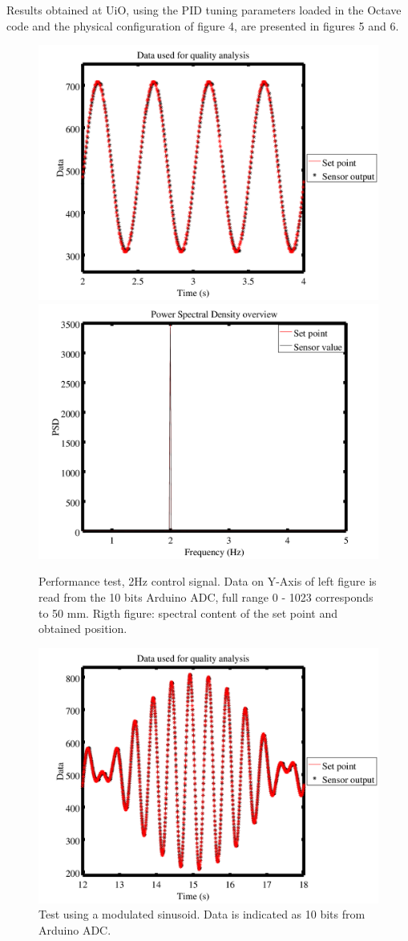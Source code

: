\documentclass[pdftex,a4paper,12pt,onecolumn,fleqn,captions=tableheading]{scrartcl}
\begin{document}
Results obtained at UiO, using the PID tuning parameters loaded in the Octave code and the physical configuration of figure 4, are presented in figures 5 and 6.

\begin{figure}
\begin{center}
\includegraphics[width=.49\textwidth]{Figures/Sine2Hz_test2.png}
\includegraphics[width=.49\textwidth]{Figures/PSD_2HzSine_test2.png}
\caption{Performance test, 2Hz control signal. Data on Y-Axis of left figure is read from the 10 bits Arduino ADC, full range 0 - 1023 corresponds to 50 mm. Rigth figure: spectral content of the set point and obtained position.}
\end{center}
\end{figure}

\begin{figure}
\begin{center}
\includegraphics[width=.5\textwidth]{Figures/ModulatedSine_test1.png}
\caption{Test using a modulated sinusoid. Data is indicated as 10 bits from Arduino ADC.}
\end{center}
\end{figure}
\end{document}
